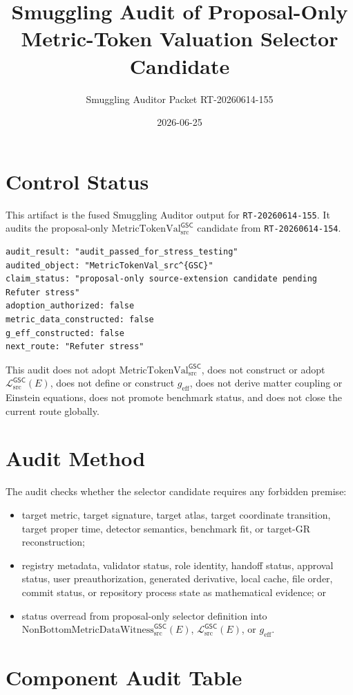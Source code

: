 \documentclass[11pt]{article}
\title{Smuggling Audit of Proposal-Only Metric-Token Valuation Selector Candidate}
\author{Smuggling Auditor Packet RT-20260614-155}
\date{2026-06-25}
\newcommand{\MetricTokenVal}{\mathrm{MetricTokenVal}_{\mathrm{src}}^{\mathsf{GSC}}}
\newcommand{\MetricData}{\mathcal{L}_{\mathrm{src}}^{\mathsf{GSC}}}
\newcommand{\Witness}{\mathrm{NonBottomMetricDataWitness}_{\mathrm{src}}^{\mathsf{GSC}}}
\newcommand{\geff}{g_{\mathrm{eff}}}
\begin{document}
\maketitle

\section{Control Status}

This artifact is the fused Smuggling Auditor output for
\texttt{RT-20260614-155}. It audits the proposal-only \(\MetricTokenVal\)
candidate from \texttt{RT-20260614-154}.

\begin{verbatim}
audit_result: "audit_passed_for_stress_testing"
audited_object: "MetricTokenVal_src^{GSC}"
claim_status: "proposal-only source-extension candidate pending Refuter stress"
adoption_authorized: false
metric_data_constructed: false
g_eff_constructed: false
next_route: "Refuter stress"
\end{verbatim}

This audit does not adopt \(\MetricTokenVal\), does not construct or adopt
\(\MetricData(E)\), does not define or construct \(\geff\), does not derive
matter coupling or Einstein equations, does not promote benchmark status, and
does not close the current route globally.

\section{Audit Method}

The audit checks whether the selector candidate requires any forbidden
premise:
\begin{itemize}[leftmargin=*]
  \item target metric, target signature, target atlas, target coordinate
  transition, target proper time, detector semantics, benchmark fit, or
  target-GR reconstruction;
  \item registry metadata, validator status, role identity, handoff status,
  approval status, user preauthorization, generated derivative, local cache,
  file order, commit status, or repository process state as mathematical
  evidence; or
  \item status overread from proposal-only selector definition into
  \(\Witness(E)\), \(\MetricData(E)\), or \(\geff\).
\end{itemize}

\section{Component Audit Table}
\end{document}
